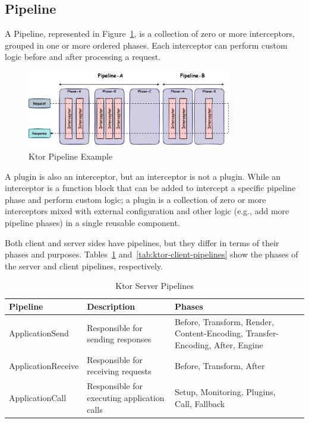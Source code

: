 \subsection{Pipeline}\label{subsec:pipeline}

A Pipeline, represented in Figure~\ref{fig:ktor-pipeline}, is a collection of zero or more interceptors, grouped in one or more ordered phases.
Each interceptor can perform custom logic before and after processing a request.

\begin{figure}[!htb]
    \centering
    \includegraphics[width=0.8\textwidth]{../figures/03_ktor-pipeline}
    \caption{Ktor Pipeline Example}
    \label{fig:ktor-pipeline}
\end{figure}

A plugin is also an interceptor, but an interceptor is not a plugin.
While an interceptor is a function block that can be added to intercept a specific pipeline phase and perform custom logic; a plugin is a collection of zero or more interceptors mixed with external configuration and other logic (e.g., add more pipeline phases) in a single reusable component.

Both client and server sides have pipelines, but they differ in terms of their phases and purposes.
Tables~\ref{tab:ktor-server-pipelines} and~\ref{tab:ktor-client-pipelines} show the phases of the server and client pipelines, respectively.

\begin{table}[!htb]
    \centering
    \caption{Ktor Server Pipelines}
    \label{tab:ktor-server-pipelines}
    \vspace{0.3cm}
    \begin{tabular}{|l|p{6cm}|p{5cm}|p{5cm}|}
        \hline
        \textbf{Pipeline}  & \textbf{Description}                        & \textbf{Phases}                                                               \\ \hline
        ApplicationSend    & Responsible for sending responses           & Before, Transform, Render, Content-Encoding, Transfer-Encoding, After, Engine \\ \hline
        ApplicationReceive & Responsible for receiving requests          & Before, Transform, After                                                      \\ \hline
        ApplicationCall    & Responsible for executing application calls & Setup, Monitoring, Plugins, Call, Fallback                                    \\ \hline
    \end{tabular}
\end{table}

